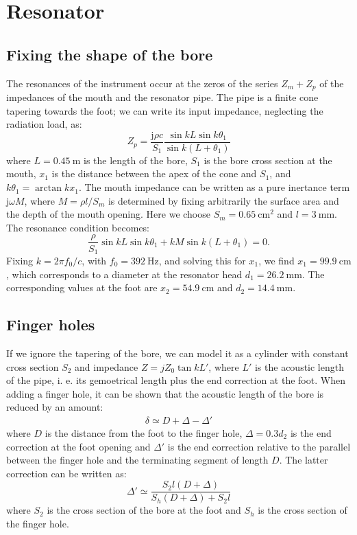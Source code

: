 \documentclass[a4paper]{article}
\begin{document}
\section{Resonator}
\subsection{Fixing the shape of the bore}
The resonances of the instrument occur at the zeros of the series $Z_m + Z_p$ of the impedances of the mouth and the resonator pipe. The pipe is a finite cone tapering towards the foot; we can write its input impedance, neglecting the radiation load, as:
$$ Z_p = \frac{\mathrm{j} \rho c }{S_1} \frac{\sin kL \sin k\theta_1}{\sin k(L+\theta_1)} $$
where $L = 0.45~\si{\meter}$ is the length of the bore, $S_1$ is the bore cross section at the mouth, $x_1$ is the distance between the apex of the cone and $S_1$, and $k\theta_1 = \arctan kx_1 $.
The mouth impedance can be written as a pure inertance term $\mathrm{j} \omega M$, where $M = \rho l / S_m$ is determined by fixing arbitrarily the surface area and the depth of the mouth opening. Here we choose $S_m = 0.65~\si{\centi\meter\squared}$ and $l = 3~\si{\milli\meter}$. 
The resonance condition becomes:
$$ \frac{\rho}{S_1} \sin kL \sin k\theta_1 + kM\sin k(L+\theta_1) = 0 .$$ 
Fixing $k = 2\pi f_0 /c$, with $f_0 = 392~\si{\hertz}$, and solving this for $x_1$, we find $x_1 = 99.9~\si{\centi\meter}$, which corresponds to a diameter at the resonator head $d_1 = 26.2~\si{\milli\meter}$. The corresponding values at the foot are $x_2 = 54.9~\si{\centi\meter}$ and $d_2 = 14.4~\si{\milli\meter}$.

\subsection{Finger holes}
If we ignore the tapering of the bore, we can model it as a cylinder with constant cross section $S_2$ and impedance $Z = jZ_0\tan kL'$, where $L'$ is the acoustic length of the pipe, i. e. its gemoetrical length plus the end correction at the foot.
When adding a finger hole, it can be shown that the acoustic length of the bore is reduced by an amount:
\begin{align*}
	\delta \simeq D + \Delta - \Delta' 
\end{align*}
where $D$ is the distance from the foot to the finger hole, $\Delta = 0.3d_2$ is the end correction at the foot opening and $\Delta'$ is the end correction relative to the parallel between the finger hole and the terminating segment of length $D$. The latter correction can be written as:
$$ \Delta' \simeq \frac{S_2 l(D+\Delta)}{S_h(D+\Delta) + S_2 l} $$
where $S_2$ is the cross section of the bore at the foot and $S_h$ is the cross section of the finger hole.
\end{document}

